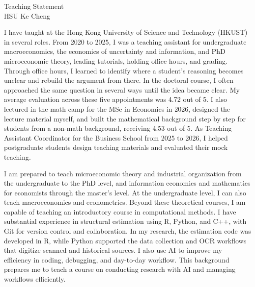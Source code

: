 \documentclass[11pt]{article}
\begin{document}
\begin{center}
{\Large Teaching Statement}\\[0.3em]
HSU Ke Cheng
\end{center}

I have taught at the Hong Kong University of Science and Technology (HKUST) in several roles. From 2020 to 2025, I was a teaching assistant for undergraduate macroeconomics, the economics of uncertainty and information, and PhD microeconomic theory, leading tutorials, holding office hours, and grading. Through office hours, I learned to identify where a student's reasoning becomes unclear and rebuild the argument from there. In the doctoral course, I often approached the same question in several ways until the idea became clear. My average evaluation across these five appointments was 4.72 out of 5. I also lectured in the math camp for the MSc in Economics in 2026, designed the lecture material myself, and built the mathematical background step by step for students from a non-math background, receiving 4.53 out of 5. As Teaching Assistant Coordinator for the Business School from 2025 to 2026, I helped postgraduate students design teaching materials and evaluated their mock teaching.

I am prepared to teach microeconomic theory and industrial organization from the undergraduate to the PhD level, and information economics and mathematics for economists through the master's level. At the undergraduate level, I can also teach macroeconomics and econometrics. Beyond these theoretical courses, I am capable of teaching an introductory course in computational methods. I have substantial experience in structural estimation using R, Python, and C++, with Git for version control and collaboration. In my research, the estimation code was developed in R, while Python supported the data collection and OCR workflows that digitize scanned and historical sources. I also use AI to improve my efficiency in coding, debugging, and day-to-day workflow. This background prepares me to teach a course on conducting research with AI and managing workflows efficiently.
\end{document}
